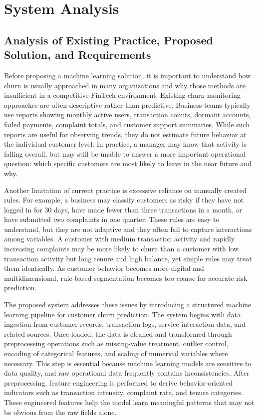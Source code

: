 \chapter{System Analysis}

\section{Analysis of Existing Practice, Proposed Solution, and Requirements}
Before proposing a machine learning solution, it is important to understand how churn is usually approached in many organizations and why those methods are insufficient in a competitive FinTech environment. Existing churn monitoring approaches are often descriptive rather than predictive. Business teams typically use reports showing monthly active users, transaction counts, dormant accounts, failed payments, complaint totals, and customer support summaries. While such reports are useful for observing trends, they do not estimate future behavior at the individual customer level. In practice, a manager may know that activity is falling overall, but may still be unable to answer a more important operational question: which specific customers are most likely to leave in the near future and why.

Another limitation of current practice is excessive reliance on manually created rules. For example, a business may classify customers as risky if they have not logged in for 30 days, have made fewer than three transactions in a month, or have submitted two complaints in one quarter. These rules are easy to understand, but they are not adaptive and they often fail to capture interactions among variables. A customer with medium transaction activity and rapidly increasing complaints may be more likely to churn than a customer with low transaction activity but long tenure and high balance, yet simple rules may treat them identically. As customer behavior becomes more digital and multidimensional, rule-based segmentation becomes too coarse for accurate risk prediction.

The proposed system addresses these issues by introducing a structured machine learning pipeline for customer churn prediction. The system begins with data ingestion from customer records, transaction logs, service interaction data, and related sources. Once loaded, the data is cleaned and transformed through preprocessing operations such as missing-value treatment, outlier control, encoding of categorical features, and scaling of numerical variables where necessary. This step is essential because machine learning models are sensitive to data quality, and raw operational data frequently contains inconsistencies. After preprocessing, feature engineering is performed to derive behavior-oriented indicators such as transaction intensity, complaint rate, and tenure categories. These engineered features help the model learn meaningful patterns that may not be obvious from the raw fields alone.

